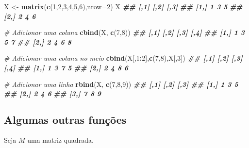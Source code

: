 \documentclass[
]{book}
\newenvironment{Shaded}{\begin{snugshade}}{\end{snugshade}}
\newcommand{\AttributeTok}[1]{\textcolor[rgb]{0.13,0.29,0.53}{#1}}
\newcommand{\CommentTok}[1]{\textcolor[rgb]{0.56,0.35,0.01}{\textit{#1}}}
\newcommand{\DecValTok}[1]{\textcolor[rgb]{0.00,0.00,0.81}{#1}}
\newcommand{\DocumentationTok}[1]{\textcolor[rgb]{0.56,0.35,0.01}{\textbf{\textit{#1}}}}
\newcommand{\FunctionTok}[1]{\textcolor[rgb]{0.13,0.29,0.53}{\textbf{#1}}}
\newcommand{\NormalTok}[1]{#1}
\newcommand{\OtherTok}[1]{\textcolor[rgb]{0.56,0.35,0.01}{#1}}
\newcommand{\SpecialCharTok}[1]{\textcolor[rgb]{0.81,0.36,0.00}{\textbf{#1}}}
\begin{document}
\begin{Shaded}
\begin{Highlighting}[]
\NormalTok{X }\OtherTok{\textless{}{-}} \FunctionTok{matrix}\NormalTok{(}\FunctionTok{c}\NormalTok{(}\DecValTok{1}\NormalTok{,}\DecValTok{2}\NormalTok{,}\DecValTok{3}\NormalTok{,}\DecValTok{4}\NormalTok{,}\DecValTok{5}\NormalTok{,}\DecValTok{6}\NormalTok{),}\AttributeTok{nrow=}\DecValTok{2}\NormalTok{)}
\NormalTok{X}
\DocumentationTok{\#\#      [,1] [,2] [,3]}
\DocumentationTok{\#\# [1,]    1    3    5}
\DocumentationTok{\#\# [2,]    2    4    6}

\CommentTok{\# Adicionar uma coluna}
\FunctionTok{cbind}\NormalTok{(X, }\FunctionTok{c}\NormalTok{(}\DecValTok{7}\NormalTok{,}\DecValTok{8}\NormalTok{))}
\DocumentationTok{\#\#      [,1] [,2] [,3] [,4]}
\DocumentationTok{\#\# [1,]    1    3    5    7}
\DocumentationTok{\#\# [2,]    2    4    6    8}

\CommentTok{\# Adicionar uma coluna no meio}
\FunctionTok{cbind}\NormalTok{(X[,}\DecValTok{1}\SpecialCharTok{:}\DecValTok{2}\NormalTok{],}\FunctionTok{c}\NormalTok{(}\DecValTok{7}\NormalTok{,}\DecValTok{8}\NormalTok{),X[,}\DecValTok{3}\NormalTok{])}
\DocumentationTok{\#\#      [,1] [,2] [,3] [,4]}
\DocumentationTok{\#\# [1,]    1    3    7    5}
\DocumentationTok{\#\# [2,]    2    4    8    6}

\CommentTok{\# Adicionar uma linha}
\FunctionTok{rbind}\NormalTok{(X, }\FunctionTok{c}\NormalTok{(}\DecValTok{7}\NormalTok{,}\DecValTok{8}\NormalTok{,}\DecValTok{9}\NormalTok{))}
\DocumentationTok{\#\#      [,1] [,2] [,3]}
\DocumentationTok{\#\# [1,]    1    3    5}
\DocumentationTok{\#\# [2,]    2    4    6}
\DocumentationTok{\#\# [3,]    7    8    9}
\end{Highlighting}
\end{Shaded}

\subsection{Algumas outras funções}\label{algumas-outras-funuxe7uxf5es}

Seja \(M\) uma matriz quadrada.
\end{document}
